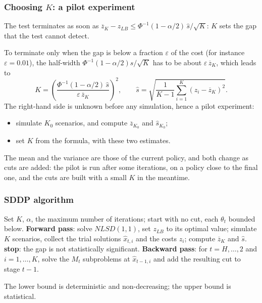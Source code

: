 \documentclass[aspectratio=169]{beamer}
\begin{document}
\begin{frame}
\frametitle{Choosing $K$: a pilot experiment}

{\small
The test terminates as soon as
$\overline{z}_K - z_{LB} \leq \Phi^{-1}(1-\alpha/2)\, \hat{s}/\sqrt{K}$: $K$ sets the gap that the
test cannot detect.

\mbox{}

To terminate only when the gap is below a fraction $\varepsilon$ of the cost (for instance
$\varepsilon = 0.01$), the half-width $\Phi^{-1}(1-\alpha/2)\hat{s}/\sqrt{K}$ has to be about
$\varepsilon\, \overline{z}_K$, which leads to
$$
K = \left( \frac{\Phi^{-1}(1-\alpha/2)\,\hat{s}}{\varepsilon\, \overline{z}_K}\right)^2,
\qquad
\hat{s} = \sqrt{\frac{1}{K-1} \sum_{i=1}^K (z_i - \overline{z}_K)^2}.
$$
The right-hand side is unknown before any simulation, hence a pilot experiment:
\begin{itemize}
\item
simulate $K_0$ scenarios, and compute $\overline{z}_{K_0}$ and $\hat{s}_{K_0}$;
\item
set $K$ from the formula, with these two estimates.
\end{itemize}
The mean and the variance are those of the current policy, and both change as cuts are added: the
pilot is run after some iterations, on a policy close to the final one, and the cuts are
built with a small $K$ in the meantime.
}

\end{frame}

\begin{frame}
\frametitle{SDDP algorithm}

\begin{small}
\begin{algorithmic}[1]
\State Set $K$, $\alpha$, the maximum number of iterations; start with no cut, each $\theta_t$ bounded below.
\Repeat
  \State \textbf{Forward pass}: solve $NLSD(1,1)$, set $z_{LB}$ to its optimal value;
  \State \quad simulate $K$ scenarios, collect the trial solutions $\hat{x}_{t,i}$ and the costs $z_i$;
  \State \quad compute $\overline{z}_K$ and $\hat{s}$.
    \State \textbf{stop}: the gap is not statistically significant.
  \EndIf
  \State \textbf{Backward pass}: for $t = H,\ldots,2$ and $i = 1,\ldots,K$, solve the $M_t$
  \State \quad subproblems at $\hat{x}_{t-1,i}$ and add the resulting cut to stage $t-1$.
\end{algorithmic}
\end{small}

{\small The lower bound is deterministic and non-decreasing; the upper bound is statistical.}

\end{frame}
\end{document}
